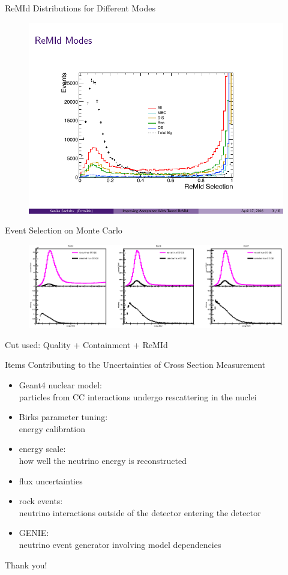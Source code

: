 \documentclass{beamer}
\begin{document}
\begin{frame}{ReMId Distributions for Different Modes}
\begin{figure}
  \centering
  \includegraphics[width=\textwidth]{figures/remid.pdf}
\end{figure}
\end{frame}

\begin{frame}{Event Selection on Monte Carlo}
\begin{figure}
  \centering
  \includegraphics[width=\textwidth]{figures/eff.eps}
\end{figure}
Cut used: Quality + Containment + ReMId
\end{frame}

\begin{frame}{Items Contributing to the Uncertainties of Cross Section Measurement}
\begin{itemize}
  \item Geant4 nuclear model:\\ particles from CC interactions undergo rescattering in the nuclei
  \item Birks parameter tuning:\\ energy calibration
  \item energy scale:\\ how well the neutrino energy is reconstructed
  \item flux uncertainties
  \item rock events:\\ neutrino interactions outside of the detector entering the detector
  \item GENIE:\\ neutrino event generator involving model dependencies
\end{itemize}
\end{frame}

\begin{frame}[c]
\begin{center}
\Huge Thank you!
\end{center}
\end{frame}
\end{document}

